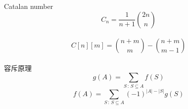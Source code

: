 Catalan number\\
\[C_n = \frac{1}{n+1}{2n \choose n} \] \\
\[C[n][m] = {n+m \choose m} - {n+m \choose m-1} \]\\
容斥原理\\
\[g(A)=\sum_{S\,:\,S\subseteq A}f(S)\]
\[f(A)=\sum_{S\,:\,S\subseteq A}(-1)^{\left|A\right|-\left|S\right|}g(S)\]
